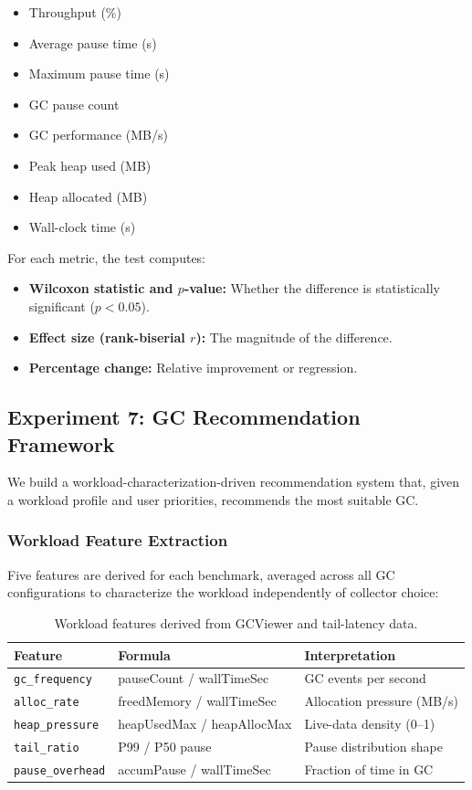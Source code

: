 \begin{itemize}
\item Throughput (\%)
\item Average pause time (s)
\item Maximum pause time (s)
\item GC pause count
\item GC performance (MB/s)
\item Peak heap used (MB)
\item Heap allocated (MB)
\item Wall-clock time (s)
\end{itemize}

For each metric, the test computes:
\begin{itemize}
\item \textbf{Wilcoxon statistic and $p$-value:} Whether the difference is statistically significant ($p < 0.05$).
\item \textbf{Effect size (rank-biserial $r$):} The magnitude of the difference.
\item \textbf{Percentage change:} Relative improvement or regression.
\end{itemize}

\subsection{Experiment 7: GC Recommendation Framework}

We build a workload-characterization-driven recommendation system that, given a workload profile and user priorities, recommends the most suitable GC.

\subsubsection{Workload Feature Extraction}

Five features are derived for each benchmark, averaged across all GC configurations to characterize the workload independently of collector choice:

\begin{table}[h]
\centering
\caption{Workload features derived from GCViewer and tail-latency data.}
\label{tab:workload-features}
\begin{tabular}{lll}
\hline
\textbf{Feature} & \textbf{Formula} & \textbf{Interpretation} \\
\hline
\texttt{gc\_frequency}    & pauseCount / wallTimeSec    & GC events per second \\
\texttt{alloc\_rate}      & freedMemory / wallTimeSec   & Allocation pressure (MB/s) \\
\texttt{heap\_pressure}   & heapUsedMax / heapAllocMax  & Live-data density (0--1) \\
\texttt{tail\_ratio}      & P99 / P50 pause             & Pause distribution shape \\
\texttt{pause\_overhead}  & accumPause / wallTimeSec    & Fraction of time in GC \\
\hline
\end{tabular}
\end{table}

